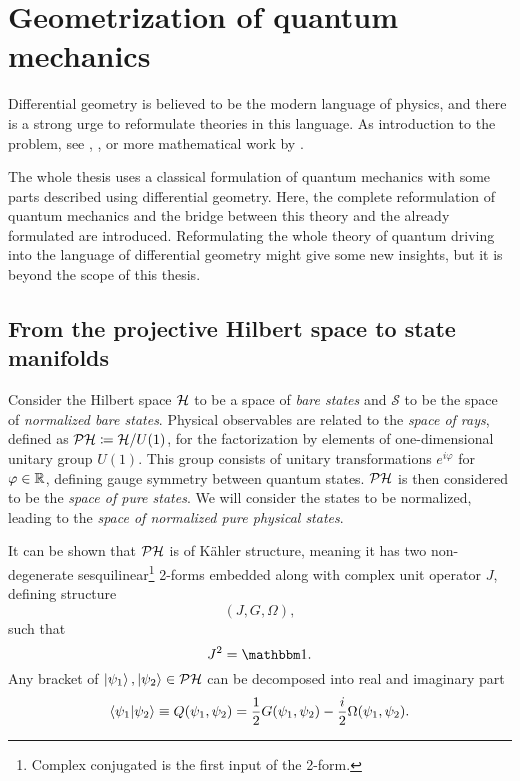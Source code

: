 \chapter{Geometrization of quantum mechanics}
\label{appendixGEOM}
Differential geometry is believed to be the modern language of physics, and there is a strong urge to reformulate theories in this language. As introduction to the problem, see \cite{ashtekar_geometrical_1997}, \cite{ashtekar_geometry_1995}, or more mathematical work by \cite{molitor_exponential_2013}.

The whole thesis uses a classical formulation of quantum mechanics with some parts described using differential geometry. Here, the complete reformulation of quantum mechanics and the bridge between this theory and the already formulated are introduced. Reformulating the whole theory of quantum driving into the language of differential geometry might give some new insights, but it is beyond the scope of this thesis.


\section{From the projective Hilbert space to state manifolds}


Consider the Hilbert space $\mathcal{H}$ to be a space of \emph{bare states} and $\mathcal{S}$ to be the space of \emph{normalized bare states}. Physical observables are related to the \emph{space of rays}, defined as $\mathcal{PH}\coloneqq \mathcal{H}/U(1)$, for the factorization by elements of one-dimensional unitary group $U(1)$. This group consists of unitary transformations $e^{i\varphi}$ for $\varphi\in\mathbb{R}$, defining gauge symmetry between quantum states. $\mathcal{PH}$ is then considered to be the \emph{space of pure states}. We will consider the states to be normalized, leading to the \emph{space of normalized pure physical states}. 

It can be shown that $\mathcal{PH}$ is of K\"ahler structure, meaning it has two non-degenerate sesquilinear\footnote{Complex conjugated is the first input of the 2-form.} 2-forms embedded along with complex unit operator $J$, defining structure
$$(J, G, \Omega),$$
such that
\begin{equation}
    J^2=\Id.
\end{equation}
Any bracket of $\ket{\psi_1},\ket{\psi_2}\in \mathcal{PH}$ can be decomposed into real and imaginary part\citep{ashtekar_geometrical_1997}
\begin{equation}
    \braket{\psi_1|\psi_2}\equiv Q(\psi_1,\psi_2)=\frac{1}{2}G(\psi_1,\psi_2)-\frac{i}{2}\Omega(\psi_1,\psi_2).
\end{equation}

